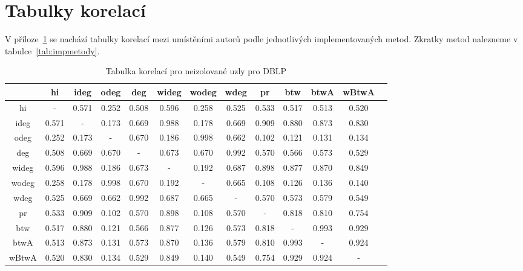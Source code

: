 \documentclass{bakalarka}
\begin{document}




\appendix

\newpage
\chapter{Tabulky korelací}
\label{chapter:tabkor}

V příloze~\ref{chapter:tabkor} se nachází tabulky korelací mezi umístěními
autorů podle jednotlivých implementovaných metod. Zkratky metod nalezneme v
tabulce~\ref{tab:impmetody}.

\begin{table}[!ht]
\centering
\caption{Tabulka korelací pro neizolované uzly pro DBLP}
\label{tab:corr1}
\begin{sideways}
\begin{tabular}{c|cccccccccccc}
\toprule
&hi  &ideg &odeg &deg  &wideg&wodeg&wdeg &pr   &btw  &btwA &wBtwA\\
\midrule
hi   &  -  &0.571&0.252&0.508&0.596&0.258&0.525&0.533&0.517&0.513&0.520\\
ideg &0.571&  -  &0.173&0.669&0.988&0.178&0.669&0.909&0.880&0.873&0.830\\
odeg &0.252&0.173&  -  &0.670&0.186&0.998&0.662&0.102&0.121&0.131&0.134\\
deg  &0.508&0.669&0.670&  -  &0.673&0.670&0.992&0.570&0.566&0.573&0.529\\
wideg&0.596&0.988&0.186&0.673&  -  &0.192&0.687&0.898&0.877&0.870&0.849\\
wodeg&0.258&0.178&0.998&0.670&0.192&  -  &0.665&0.108&0.126&0.136&0.140\\
wdeg &0.525&0.669&0.662&0.992&0.687&0.665&  -  &0.570&0.573&0.579&0.549\\
pr   &0.533&0.909&0.102&0.570&0.898&0.108&0.570&  -  &0.818&0.810&0.754\\
btw  &0.517&0.880&0.121&0.566&0.877&0.126&0.573&0.818&  -  &0.993&0.929\\
btwA &0.513&0.873&0.131&0.573&0.870&0.136&0.579&0.810&0.993&  -  &0.924\\
wBtwA&0.520&0.830&0.134&0.529&0.849&0.140&0.549&0.754&0.929&0.924&  -  \\
\bottomrule
\end{tabular}
\end{sideways}
\end{table}
\end{document}
